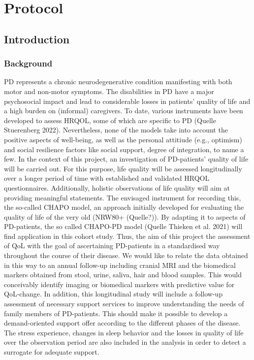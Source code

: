 \chapter{Protocol}
\section{Introduction}
\subsection{Background}
\ac{PD} represents a chronic neurodegenerative condition manifesting with both motor and non-motor symptoms. The disabilities in \ac{PD} have a major psychosocial impact and lead to considerable losses in patients' quality of life and a high burden on (informal) caregivers. To date, various instruments have been developed to assess \ac{HRQOL}, some of which are specific to \ac{PD} (Quelle Stuerenberg 2022). Nevertheless, none of the models take into account the positive aspects of well-being, as well as the personal attitiude (e.g., optimism) and social resilience factors like social support, degree of integration, to name a few. In the context of this project, an investigation of \ac{PD}-patients' quality of life will be carried out. For this purpose, life quality will be assessed longitudinally over a longer period of time with established and validated \ac{HRQOL} questionnaires. Additionally, holistic observations of life quality will aim at providing meaningful statements. The envisaged instrument for recording this, the so-called \ac{CHAPO} model, an approach initially developed for evaluating the quality of life of the very old (NRW80+ (Quelle?)). By adapting it to aspects of \ac{PD}-patients, the so called \acs{CHAPO}-\ac{PD} model (Quelle Thieken et al. 2021) will find application in this cohort study. Thus, the aim of this project the assessment of \ac{QoL} with the goal of ascertaining \ac{PD}-patients in a standardised way throughout the course of their disease. We would like to relate the data obtained in this way to an annual follow-up including cranial \ac{MRI} and the biomedical markers obtained from stool, urine, saliva, hair and blood samples. This would conceivably identify imaging or biomedical markers with predictive value for \ac{QoL}-change. In addition, this longitudinal study will include a follow-up assessment of necessary support services to improve understanding the needs of family members of \ac{PD}-patients. This should make it possible to develop a demand-oriented support offer according to the different phases of the disease. The stress experience, changes in sleep behavior and the losses in quality of life over the observation period are also included in the analysis in order to detect a surrogate for adequate support.

